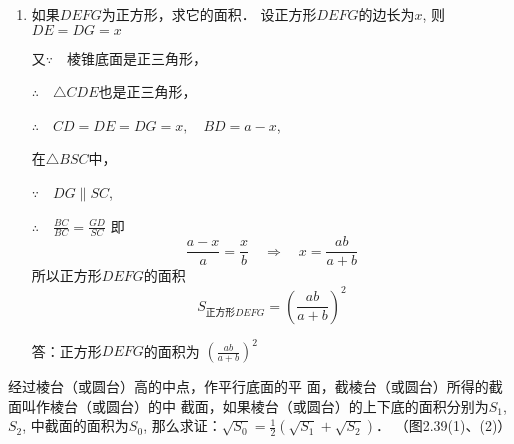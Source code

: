 \begin{solution}
\begin{enumerate}
\item 如果$DEFG$为正方形，求它的面积．
设正方形$DEFG$的边长为$x$, 则
$DE=DG=x$

又$\because\quad $棱锥底面是正三角形，

$\therefore\quad \triangle  CDE$也是正三角形，

$\therefore\quad CD=DE=DG=x,\quad BD=a-x$,

在$\triangle BSC$中，

$\because\quad DG\parallel SC$,

$\therefore\quad \frac{BC}{BC}=\frac{GD}{SC}$
即
\[\frac{a-x}{a}=\frac{x}{b}\quad \Rightarrow\quad x=\frac{ab}{a+b}\]
所以正方形$DEFG$的面积
\[S_{\text{正方形}DEFG}=\left(\frac{ab}{a+b}\right)^2\]

答：正方形$DEFG$的面积为
$\left(\frac{ab}{a+b}\right)^2$
\end{enumerate}
\end{solution}

\begin{example}
    经过棱台（或圆台）高的中点，作平行底面的平
面，截棱台（或圆台）所得的截面叫作棱台（或圆台）的中
截面，如果棱台（或圆台）的上下底的面积分别为$S_1$, $S_2$,
中截面的面积为$S_0$, 那么求证：$\sqrt{S_0}=\frac{1}{2}\left(\sqrt{S_1}+\sqrt{S_2}\right)$．
（图2.39(1)、(2)）
\end{example}

